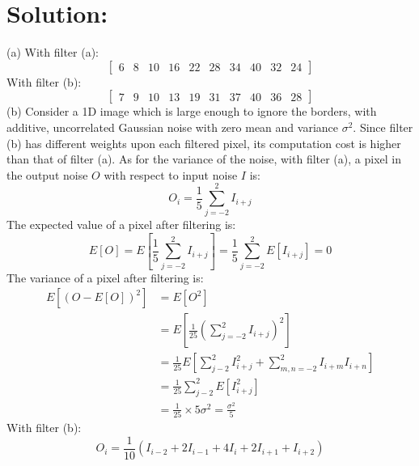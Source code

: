 \documentclass[12pt]{article}
\begin{document}
\vfill
\clearpage
\section{Solution:}
(a) With filter (a): 
\begin{equation*}
{\left[ \begin{array}{cccccccccc}
6 & 8 & 10 & 16 & 22 & 28 & 34&  40 &  32& 24
\end{array} \right]}
\end{equation*}
\noindent With filter (b):
\begin{equation*}
{\left[ \begin{array}{cccccccccc}
7 & 9 & 10 & 13 & 19 & 31 & 37 & 40 & 36 & 28
\end{array} \right]}
\end{equation*}
\noindent (b) Consider a 1D image which is large enough to ignore the borders, with additive, uncorrelated Gaussian noise with zero mean and variance $\sigma^2$. Since filter (b) has different weights upon each filtered pixel, its computation cost is higher than that of filter (a). As for the variance of the noise, with filter (a), a pixel in the output noise $O$ with respect to input noise $I$ is:
\begin{equation*}
O_i = \frac{1}{5}\sum^2_{j = -2}I_{i+j}
\end{equation*}
The expected value of a pixel after filtering is:
\begin{equation*}
E[O] = E\left[\frac{1}{5}\sum^2_{j = -2}I_{i+j}\right] = \frac{1}{5}\sum^2_{j=-2}E\left[I_{i+j}\right] = 0
\end{equation*}
The variance of a pixel after filtering is:
\begin{equation*}
\begin{aligned}
E[(O-E[O])^2] &= E[O^2] \\
&= E\left[\frac{1}{25}\left(\sum^2_{j = -2}I_{i+j}\right)^2\right]\\
&= \frac{1}{25}E\left[\sum^2_{j-2}I^2_{i+j} + \sum^2_{m,n = -2}I_{i+m}I_{i+n}\right]\\
&= \frac{1}{25}\sum^2_{j-2}E\left[I^2_{i+j}\right]\\
&=\frac{1}{25}\times5\sigma^2 = \frac{\sigma^2}{5}
\end{aligned}
\end{equation*}
With filter (b):
\begin{equation*}
O_i = \frac{1}{10}\left(I_{i-2} + 2I_{i-1} + 4I_{i} + 2I_{i+1} + I_{i+2}\right)
\end{equation*}
\end{document}
